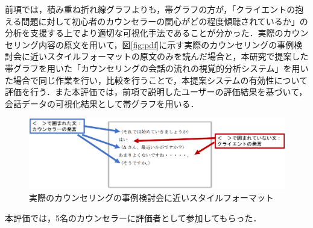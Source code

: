 \documentclass[shuuron]{kuee}
\begin{document}


前項では，積み重ね折れ線グラフよりも，帯グラフの方が，「クライエントの抱える問題に対して初心者のカウンセラーの関心がどの程度傾聴されているか」の分析を支援する上でより適切な可視化手法であることが分かった．実際のカウンセリング内容の原文を用いて，図\ref{fig:pdf}に示す実際のカウンセリングの事例検討会に近いスタイルフォーマットの原文のみを読んだ場合と，本研究で提案した帯グラフを用いた「カウンセリングの会話の流れの視覚的分析システム」を用いた場合で同じ作業を行い，比較を行うことで，本提案システムの有効性について評価を行う．また本評価では，前項で説明したユーザーの評価結果を基づいて，会話データの可視化結果として帯グラフを用いる．

\begin{figure}
  \begin{center}
    \includegraphics[width=\linewidth]{pdf.png}
  \end{center}
  \caption{実際のカウンセリングの事例検討会に近いスタイルフォーマット}
  \label{fig:keijouAnketo}
\end{figure}


本評価では，5名のカウンセラーに評価者として参加してもらった．

\end{document}
